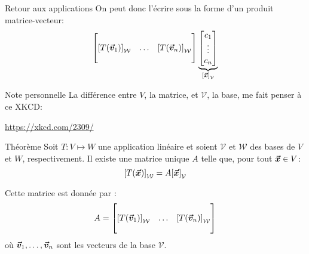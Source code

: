 \documentclass[a4paper]{article}
\begin{document}
\begin{parag}{Retour aux applications}
    On peut donc l'écrire sous la forme d'un produit matrice-vecteur:
    \[\begin{bmatrix}  &  &  \\ \left[T\left(\bvec{v}_1\right)\right]_{\mathcal{W}} & \ldots & \left[T\left(\bvec{v}_n\right)\right]_{\mathcal{W}} \\  &  &  \end{bmatrix} \underbrace{\begin{bmatrix} c_1 \\ \vdots \\ c_n \end{bmatrix}}_{\left[\bvec{x}\right]_{\mathcal{V}}} \]

    \begin{subparag}{Note personnelle}
        La différence entre $V$, la matrice, et $\mathcal{V}$, la base, me fait penser à ce XKCD:

        
        \begin{center}
            \url{https://xkcd.com/2309/}
        \end{center}
        
    \end{subparag}
    
\end{parag}

\begin{parag}{Théorème}
    Soit $T: V \mapsto W$ une application linéaire et soient $\mathcal{V}$ et $\mathcal{W}$ des bases de $V$ et $W$, respectivement. Il existe une matrice unique $A$ telle que, pour tout $\bm{\protect\vec{x}} \in V$:
    \[\left[T\left(\bvec{x}\right)\right]_{\mathcal{W}} = A \left[\bvec{x}\right]_{\mathcal{V}}\]

    Cette matrice est donnée par :
    \[A = \begin{bmatrix}  &  &  \\ \left[T\left(\bvec{v}_1\right)\right]_{\mathcal{W}} & \ldots & \left[T\left(\bvec{v}_n\right)\right]_{\mathcal{W}} \\  &  &  \end{bmatrix} \]
    où $\bm{\protect\vec{v}}_1, \ldots, \bm{\protect\vec{v}}_n$ sont les vecteurs de la base $\mathcal{V}$.

\end{parag}
\end{document}
